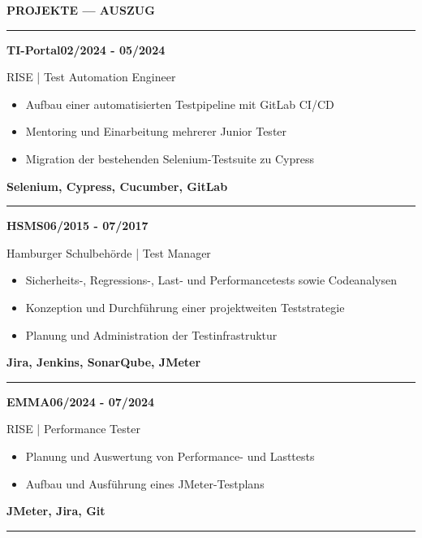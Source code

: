 \documentclass[9pt,a4paper]{article}
\newcommand{\maintitle}[1]{{\color{accent}\fontsize{7.0}{7.5}\selectfont\bfseries\MakeUppercase{#1}\par}{\color{rulefg}\rule{\linewidth}{0.25pt}\par}\vspace{0.8mm}}
\newcommand{\entryname}[1]{{\fontsize{6.45}{7.9}\selectfont\bfseries #1}}
\newcommand{\entrymeta}[1]{{\color{mutedfg}\fontsize{5.55}{7.2}\selectfont #1}}
\newcommand{\entryperiod}[1]{{\color{accent}\fontsize{5.35}{6.4}\selectfont\bfseries\MakeUppercase{#1}}}
\newcommand{\toolline}[1]{{\color{accent}\fontsize{5.3}{6.6}\selectfont\bfseries #1\par}}
\newenvironment{detailitemize}{\fontsize{5.75}{7.7}\selectfont\begin{itemize}\setlength{\leftmargin}{2.4mm}\setlength{\itemsep}{0.55mm}\setlength{\topsep}{0.75mm}\setlength{\parsep}{0pt}\setlength{\parskip}{0pt}\setlength{\partopsep}{0pt}}{\end{itemize}}
\newlength{\mainwidth}
\begin{document}
\begin{minipage}[t]{\mainwidth}
\vspace{4.5mm}
\maintitle{Projekte --- Auszug}
{\entryname{TI-Portal}\hfill\entryperiod{02/2024 - 05/2024}\par}
{\entrymeta{RISE | Test Automation Engineer}\par}
\begin{detailitemize}
\item {\fontsize{5.75}{7.7}\selectfont Aufbau einer automatisierten Testpipeline mit GitLab CI/CD}
\item {\fontsize{5.75}{7.7}\selectfont Mentoring und Einarbeitung mehrerer Junior Tester}
\item {\fontsize{5.75}{7.7}\selectfont Migration der bestehenden Selenium-Testsuite zu Cypress}
\end{detailitemize}
\toolline{Selenium, Cypress, Cucumber, GitLab}
\vspace{1.5mm}
{\color{rulefg}\rule{\linewidth}{0.2pt}\par}
\vspace{1.5mm}
{\entryname{HSMS}\hfill\entryperiod{06/2015 - 07/2017}\par}
{\entrymeta{Hamburger Schulbehörde | Test Manager}\par}
\begin{detailitemize}
\item {\fontsize{5.75}{7.7}\selectfont Sicherheits-, Regressions-, Last- und Performancetests sowie Codeanalysen}
\item {\fontsize{5.75}{7.7}\selectfont Konzeption und Durchführung einer projektweiten Teststrategie}
\item {\fontsize{5.75}{7.7}\selectfont Planung und Administration der Testinfrastruktur}
\end{detailitemize}
\toolline{Jira, Jenkins, SonarQube, JMeter}
\vspace{1.5mm}
{\color{rulefg}\rule{\linewidth}{0.2pt}\par}
\vspace{1.5mm}
{\entryname{EMMA}\hfill\entryperiod{06/2024 - 07/2024}\par}
{\entrymeta{RISE | Performance Tester}\par}
\begin{detailitemize}
\item {\fontsize{5.75}{7.7}\selectfont Planung und Auswertung von Performance- und Lasttests}
\item {\fontsize{5.75}{7.7}\selectfont Aufbau und Ausführung eines JMeter-Testplans}
\end{detailitemize}
\toolline{JMeter, Jira, Git}
\vspace{1.5mm}
{\color{rulefg}\rule{\linewidth}{0.2pt}\par}
\vspace{1.5mm}


\end{minipage}
\end{document}
